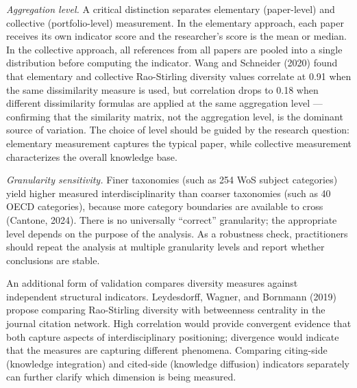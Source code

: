 \documentclass[
]{article}
\begin{document}
\emph{Aggregation level.} A critical distinction separates elementary
(paper-level) and collective (portfolio-level) measurement. In the
elementary approach, each paper receives its own indicator score and the
researcher's score is the mean or median. In the collective approach,
all references from all papers are pooled into a single distribution
before computing the indicator. Wang and Schneider (2020) found that
elementary and collective Rao-Stirling diversity values correlate at
0.91 when the same dissimilarity measure is used, but correlation drops
to 0.18 when different dissimilarity formulas are applied at the same
aggregation level --- confirming that the similarity matrix, not the
aggregation level, is the dominant source of variation. The choice of
level should be guided by the research question: elementary measurement
captures the typical paper, while collective measurement characterizes
the overall knowledge base.

\emph{Granularity sensitivity.} Finer taxonomies (such as 254 WoS
subject categories) yield higher measured interdisciplinarity than
coarser taxonomies (such as 40 OECD categories), because more category
boundaries are available to cross (Cantone, 2024). There is no
universally ``correct'' granularity; the appropriate level depends on
the purpose of the analysis. As a robustness check, practitioners should
repeat the analysis at multiple granularity levels and report whether
conclusions are stable.

An additional form of validation compares diversity measures against
independent structural indicators. Leydesdorff, Wagner, and Bornmann
(2019) propose comparing Rao-Stirling diversity with betweenness
centrality in the journal citation network. High correlation would
provide convergent evidence that both capture aspects of
interdisciplinary positioning; divergence would indicate that the
measures are capturing different phenomena. Comparing citing-side
(knowledge integration) and cited-side (knowledge diffusion) indicators
separately can further clarify which dimension is being measured.
\end{document}
